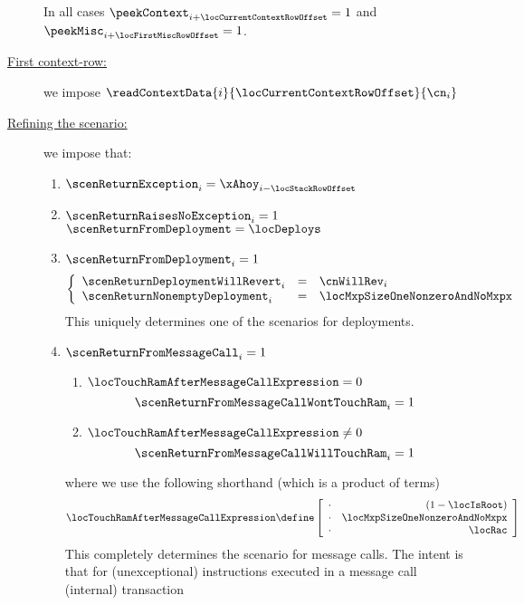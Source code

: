 \begin{description}
		\saNote{} In all cases 
		$\peekContext  _{i + \locCurrentContextRowOffset} = 1$ and
		$\peekMisc     _{i + \locFirstMiscRowOffset} = 1$.
	\item[\underline{First context-row:}]
		we impose $\readContextData{i}{\locCurrentContextRowOffset}{\cn_{i}}$
	\item[\underline{Refining the \inst{RETURN} scenario:}]
		we impose that:
		\begin{enumerate}
		        \item $\scenReturnException_{i} = \xAhoy_{i - \locStackRowOffset}$
			\item \If $\scenReturnRaisesNoException _{i} = 1$ \Then $\scenReturnFromDeployment = \locDeploys$
			\item \If $\scenReturnFromDeployment    _{i} = 1$ \Then
				\[
					\left\{ \begin{array}{lcl}
						\scenReturnDeploymentWillRevert _{i} & = & \cnWillRev _{i}                \\
						\scenReturnNonemptyDeployment   _{i} & = & \locMxpSizeOneNonzeroAndNoMxpx \\
					\end{array} \right.
				\]
				\saNote{}
				This uniquely determines one of the  scenarios for deployments.
			\item \If $\scenReturnFromMessageCall   _{i} = 1$ \Then
				\begin{enumerate}
					\item \If $\locTouchRamAfterMessageCallExpression =    0$ \Then \[ \scenReturnFromMessageCallWontTouchRam _{i} = 1 \]
					\item \If $\locTouchRamAfterMessageCallExpression \neq 0$ \Then \[ \scenReturnFromMessageCallWillTouchRam _{i} = 1 \]
				\end{enumerate}
				where we use the following shorthand (which is a product of terms)
				\[
					\locTouchRamAfterMessageCallExpression
					\define
					\left[ \begin{array}{cr}
                                                \cdot & (1 - \locIsRoot)               \\
						\cdot & \locMxpSizeOneNonzeroAndNoMxpx \\
						\cdot & \locRac                        \\
					\end{array} \right]
				\]
				\saNote{} 
				This completely determines the  scenario for message calls.
				The intent is that for (unexceptional)  instructions executed in a message call (internal) transaction

\end{enumerate}
\end{description}

